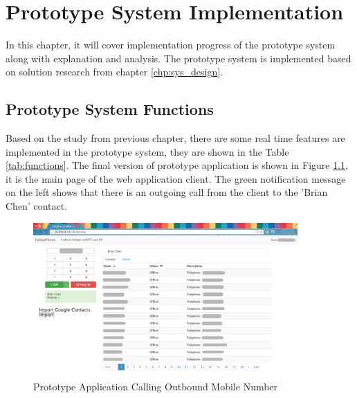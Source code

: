 \chapter{Prototype System Implementation}
\label{chp:sys_imp}

\noindent In this chapter, it will cover implementation progress of the prototype system along with explanation and analysis. The prototype system is implemented based on solution research from chapter \ref{chp:sys_design}.

\section{Prototype System Functions}

\noindent Based on the study from previous chapter, there are some real time features are implemented in the prototype system, they are shown in the Table \ref{tab:functions}. The final version of prototype application is shown in Figure \ref{fig:webgui_call_outgoing}, it is the main page of the web application client. The green notification message on the left shows that there is an outgoing call from the client to the 'Brian Chen' contact.

\begin{figure}
	\centering
    	\includegraphics[width=0.90\textwidth,natwidth=610,natheight=642]{figs/webgui_call_outgoing.png}
  	\caption{Prototype Application Calling Outbound Mobile Number}
  	\label{fig:webgui_call_outgoing}
\end{figure}


